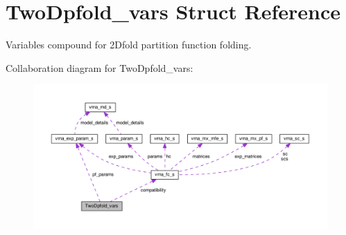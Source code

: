 \hypertarget{structTwoDpfold__vars}{\section{Two\-Dpfold\-\_\-vars Struct Reference}
\label{structTwoDpfold__vars}
}


Variables compound for 2\-Dfold partition function folding.  




Collaboration diagram for Two\-Dpfold\-\_\-vars\-:
\nopagebreak
\begin{figure}[H]
\begin{center}
\leavevmode
\includegraphics[width=350pt]{structTwoDpfold__vars__coll__graph}
\end{center}
\end{figure}
